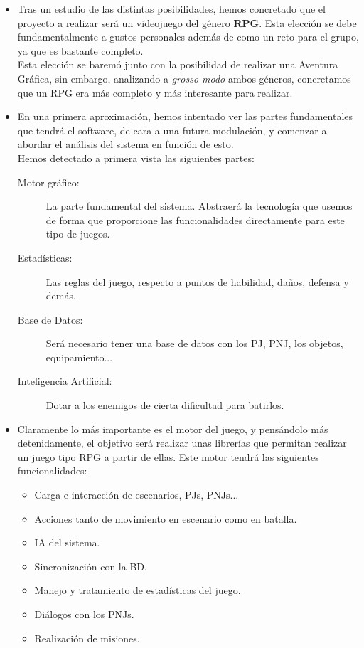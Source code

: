 \documentclass[a4paper,10pt]{article}
\begin{document}
\begin{itemize}
\item Tras un estudio de las distintas posibilidades, hemos concretado
  que el proyecto a realizar será un videojuego del género
  \textbf{RPG}. Esta elección se debe fundamentalmente a gustos
  personales además de como un reto para el grupo, ya que es bastante
  completo.\\

  \noindent Esta elección se baremó junto con la posibilidad de
  realizar una Aventura Gráfica, sin embargo, analizando a
  \textit{grosso modo}  ambos géneros, concretamos que un RPG era más
  completo y más interesante para realizar.
\item En una primera aproximación, hemos intentado ver las partes
  fundamentales que tendrá el software, de cara a una futura modulación,
  y comenzar a abordar el análisis del sistema en función de
  esto. \\

  \noindent Hemos detectado a primera vista las siguientes partes:
  
  \begin{description}
  \item[Motor gráfico: ] La parte fundamental del sistema. Abstraerá
    la tecnología que usemos de forma que proporcione las
    funcionalidades directamente para este tipo de juegos.
  \item[Estadísticas: ] Las reglas del juego, respecto a puntos de
    habilidad, daños, defensa y demás.
  \item[Base de Datos: ] Será necesario tener una base de datos con
    los PJ, PNJ, los objetos, equipamiento...
  \item[Inteligencia Artificial: ] Dotar a los enemigos de cierta
    dificultad para batirlos.
  \end{description}


\item Claramente lo más importante es el motor del juego, y
  pensándolo más detenidamente, el objetivo será realizar unas
  librerías que permitan realizar un juego tipo RPG a partir de ellas.
  Este motor tendrá las siguientes funcionalidades:

  \begin{itemize}
  \item Carga e interacción de escenarios, PJs, PNJs...
  \item Acciones tanto de movimiento en escenario como en batalla.
  \item IA del sistema.
  \item Sincronización con la BD.
  \item Manejo y tratamiento de estadísticas del juego.
  \item Diálogos con los PNJs.
  \item Realización de misiones.
  \end{itemize}
  

\end{itemize}
\end{document}
